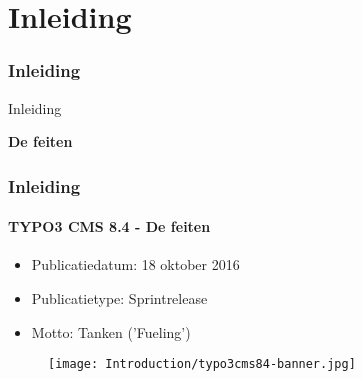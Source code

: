 %

\section{Inleiding}
\begin{frame}[fragile]
	\frametitle{Inleiding}

	\begin{center}\huge{Inleiding}\end{center}
	\begin{center}\huge{\color{typo3darkgrey}\textbf{De feiten}}\end{center}

\end{frame}

\begin{frame}[fragile]
	\frametitle{Inleiding}
	\framesubtitle{TYPO3 CMS 8.4 - De feiten}

	\begin{itemize}
		\item Publicatiedatum: 18 oktober 2016
		\item Publicatietype: Sprintrelease
		\item Motto: Tanken ('Fueling')
	\end{itemize}

	\begin{figure}
		\texttt{[image: Introduction/typo3cms84-banner.jpg]}
	\end{figure}

\end{frame}

